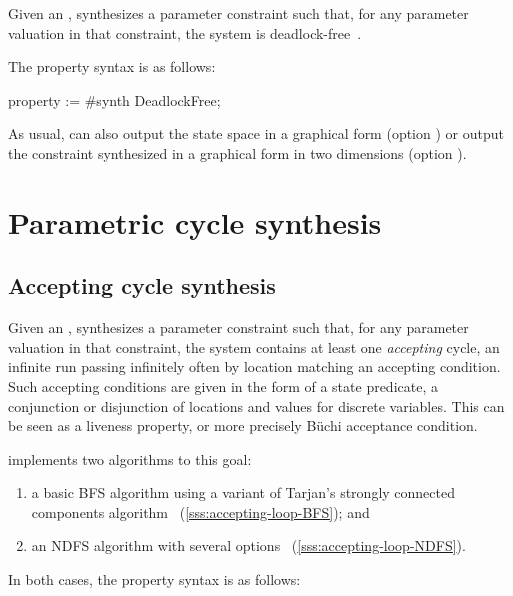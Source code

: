 Given an \NIPTA{}, \PDFC{} synthesizes a parameter constraint such that, for any parameter valuation in that constraint, the system is deadlock-free~\cite{Andre16}.

The property syntax is as follows:

\begin{IMITATORproperty}
property := #synth DeadlockFree;
\end{IMITATORproperty}

As usual, \imitator{} can also
output the state space in a graphical form (option )
or
output the constraint synthesized in a graphical form in two dimensions (option ).


\section{Parametric cycle synthesis}\label{ss:mode:LoopSynth}


\subsection{Accepting cycle synthesis}\label{ss:accepting-loop}
Given an \NIPTA{}, \imitator{} synthesizes a parameter constraint such that, for any parameter valuation in that constraint, the system contains at least one \emph{accepting} cycle, \ie{} an infinite run passing infinitely often by location matching an accepting condition.
Such accepting conditions are given in the form of a state predicate, \ie{} a conjunction or disjunction of locations and values for discrete variables.
This can be seen as a liveness property, or more precisely Büchi acceptance condition.

\imitator{} implements two algorithms to this goal:
\begin{enumerate}
	\item a basic BFS algorithm using a variant of Tarjan's strongly connected components algorithm~\cite{AAPP21} (\cref{sss:accepting-loop-BFS}); and
	\item an NDFS algorithm with several options~\cite{NPP18,AAPP21} (\cref{sss:accepting-loop-NDFS}).
\end{enumerate}

In both cases, the property syntax is as follows:

